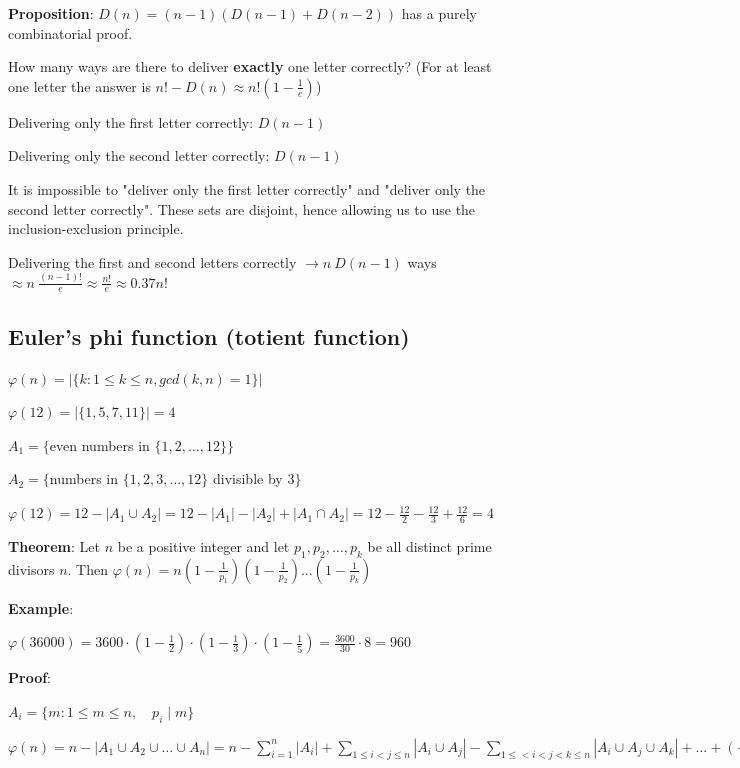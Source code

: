 \documentclass[9pt, letterpaper, oneside]{article}
\begin{document}
\textbf{Proposition}: $D(n) = (n-1)(D(n-1) + D(n-2))$ has a purely combinatorial proof.

How many ways are there to deliver \textbf{exactly} one letter correctly? (For at least one letter the answer is $n! - D(n) \approx n! (1 - \frac{1}{e})$)

Delivering only the first letter correctly: $D(n-1)$

Delivering only the second letter correctly: $D(n-1)$

It is impossible to "deliver only the first letter correctly"  and "deliver only the second letter correctly". These sets are disjoint, hence allowing us to use the inclusion-exclusion principle.

Delivering the first and second letters correctly $\to n \ D(n-1)$ ways $\approx n \ \frac{(n-1)!}{e} \approx \frac{n!}{e} \approx 0.37 n!$

\subsection{Euler's phi function (totient function)}

$\varphi(n) = | \{ k : 1 \leq k \leq n, gcd(k, n) = 1 \} |$

$\varphi(12) = | \{1,5,7,11 \} | = 4 $

$A_1 = \{$even numbers in $\{1,2, \ldots ,12\}\}$

$A_2 = \{$numbers in $\{1, 2, 3, \ldots, 12\}$ divisible by $3\}$

$\varphi(12) = 12 - |A_1 \cup A_2| = 12 - |A_1| - |A_2| + |A_1 \cap A_2| = 12 - \frac{12}{2} - \frac{12}{3} + \frac{12}{6} = 4$ 

\textbf{Theorem}: Let $n$ be a positive integer and let $p_1, p_2, \ldots, p_k$ be all distinct prime divisors $n$. Then $\varphi(n) = n(1 - \frac{1}{p_1})(1 - \frac{1}{p_2})\dots(1 - \frac{1}{p_k})$

\textbf{Example}:

$\varphi(36000) = 3600 \cdot (1 - \frac{1}{2}) \cdot (1 - \frac{1}{3}) \cdot (1 - \frac{1}{5}) = \frac{3600}{30} \cdot 8 = 960$

\textbf{Proof}:

$A_i = \{m : 1 \leq m \leq n, \quad p_i \mid m\}$

$\displaystyle \varphi(n) = n - |A_1 \cup A_2 \cup \ldots \cup A_n| = n - \sum_{i=1}^n|A_i| + \sum_{1 \leq i < j \leq n} |A_i \cup A_j| - \sum_{1 \leq < i < j<k\leq n} |A_i \cup A_j \cup A_k| + \ldots + (-1)^{n} |A_1 \cap A_2 \ldots \cap A_n|$
\end{document}
